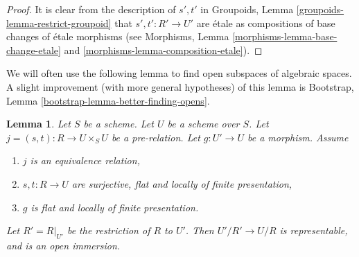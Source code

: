 \documentclass{stacks-project}
\theoremstyle{plain}
\newtheorem{lemma}[subsection]{Lemma}
\theoremstyle{definition}
\theoremstyle{remark}
\numberwithin{equation}{subsection}
\begin{document}
\begin{proof}
It is clear from the description of $s', t'$ in
Groupoids, Lemma \ref{groupoids-lemma-restrict-groupoid}
that $s' , t' : R' \to U'$ are \'etale
as compositions of base changes of \'etale morphisms
(see Morphisms, Lemma \ref{morphisms-lemma-base-change-etale}
and \ref{morphisms-lemma-composition-etale}).
\end{proof}

\noindent
We will often use the following lemma to find open subspaces of algebraic
spaces. A slight improvement (with more general hypotheses) of this lemma is
Bootstrap, Lemma \ref{bootstrap-lemma-better-finding-opens}.

\begin{lemma}
\label{lemma-finding-opens}
Let $S$ be a scheme.
Let $U$ be a scheme over $S$.
Let $j = (s, t) : R \to U \times_S U$ be a pre-relation.
Let $g : U' \to U$ be a morphism.
Assume
\begin{enumerate}
\item $j$ is an equivalence relation,
\item $s, t : R \to U$ are surjective, flat and
locally of finite presentation,
\item $g$ is flat and locally of finite presentation.
\end{enumerate}
Let $R' = R|_{U'}$ be the restriction of $R$ to $U'$. Then
$U'/R' \to U/R$ is representable, and is an open immersion.
\end{lemma}
\end{document}
